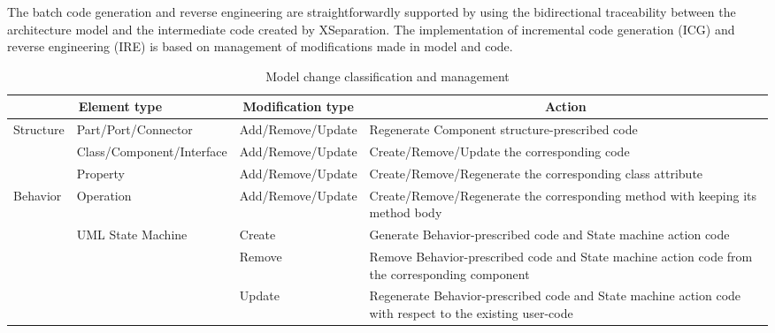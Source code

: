 The batch code generation and reverse engineering are straightforwardly supported by using the bidirectional traceability between the architecture model and the intermediate code created by XSeparation. 
The implementation of incremental code generation (ICG) and reverse engineering (IRE) is based on management of modifications made in model and code.


\begin{table}[]
	\scriptsize
	\centering
	\caption{Model change classification and management}
	\label{table:modelchangeclassification}
	\begin{tabular}{|l|p{3cm}|l|p{9.5cm}|}
		\hline
		\multicolumn{2}{|c|}{Element type}                              & \multicolumn{1}{c|}{Modification type} & \multicolumn{1}{c|}{Action}                                                                              \\ \hline
		\multirow{3}{*}{Structure} & Part/Port/Connector                & Add/Remove/Update                      & Regenerate Component structure-prescribed code                                                           \\ \cline{2-4} 
		& Class/Component/Interface          & Add/Remove/Update                      & Create/Remove/Update the corresponding code                                                              \\ \cline{2-4} 
		& Property                           & Add/Remove/Update                      & Create/Remove/Regenerate the corresponding class attribute                                               \\ \hline
		\multirow{4}{*}{Behavior}  & Operation                          & Add/Remove/Update                      & Create/Remove/Regenerate the corresponding method with keeping its method body                           \\ \cline{2-4} 
		& \multirow{3}{*}{UML State Machine} & Create                                 & Generate Behavior-prescribed code and State machine action code                                          \\ \cline{3-4} 
		&                                    & Remove                                 & Remove Behavior-prescribed code and State machine action code from the corresponding component           \\ \cline{3-4} 
		&                                    & Update                                 & Regenerate Behavior-prescribed code and State machine action code with respect to the existing user-code \\
		\hline
	\end{tabular}
\end{table}


